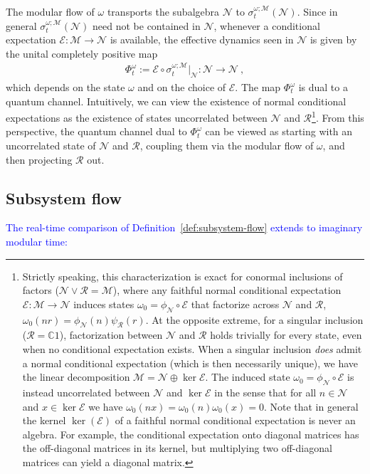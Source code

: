 \documentclass[a4paper,11pt]{article}
\theoremstyle{definition}
\newcommand{\mR}{\mathcal{R}}
\newcommand{\mN}{\mathcal{N}}
\newcommand{\mM}{\mathcal{M}}
\newcommand{\NL}[1]{\textcolor{blue}{#1}}
\newcommand{\mE}{\mathcal{E}}
\begin{document}
The modular flow of $\omega$ transports the subalgebra $\mN$ to
$\sigma^{\omega;\mM}_t(\mN)$. Since in general
$\sigma^{\omega;\mM}_t(\mN)$ need not be contained in $\mN$, whenever a conditional expectation $\mE:\mM\to\mN$ is available, the effective dynamics seen in $\mN$ is given by the unital completely positive map
\begin{align}
    \Phi^{\omega}_t:=\mE\circ\sigma^{\omega;\mM}_t\big|_{\mN}:\mN\to\mN\ ,
    \label{eq:reduced-dynamics}
\end{align}
which depends on the state $\omega$ and on the choice of $\mE$. The map $\Phi^{\omega}_t$ is dual to a quantum channel. Intuitively, we can view the existence of normal conditional expectations as the existence of states uncorrelated between $\mN$ and $\mR$\footnote{Strictly speaking, this characterization is exact for conormal inclusions of factors ($\mN \vee \mR = \mM$), where any faithful normal conditional expectation $\mE: \mM \to \mN$ induces states $\omega_0 = \phi_{\mN} \circ \mE$ that factorize across $\mN$ and $\mR$, $\omega_0(nr) = \phi_{\mN}(n)\psi_{\mR}(r)$. At the opposite extreme, for a singular inclusion ($\mR = \mathbb{C}1$), factorization between $\mN$ and $\mR$ holds trivially for every state, even when no conditional expectation exists. When a singular inclusion \emph{does} admit a normal conditional expectation (which is then necessarily unique), we have the linear decomposition $\mM=\mN\oplus \ker{\mE}$.  The induced state $\omega_0 = \phi_{\mN} \circ \mE$ is instead uncorrelated between $\mN$ and $\ker\mE$ in the sense that for all $n\in\mN$ and $x\in \ker\mE$ we have $\omega_0(n x)=\omega_0(n) \omega_0(x)=0$. Note that in general the kernel $\ker(\mE)$ of a faithful normal conditional expectation is never an algebra. For example, the conditional expectation onto diagonal matrices has the off-diagonal matrices in its kernel, but multiplying two off-diagonal matrices can yield a diagonal matrix.}. From this perspective, the quantum channel dual to $\Phi^{\omega}_t$ can be viewed as starting with an uncorrelated state of $\mN$ and $\mR$, coupling them via the modular flow of $\omega$, and then projecting $\mR$ out.

\subsection{Subsystem flow}
\label{subsec:analytic-subsystem-flow}

\NL{The real-time comparison of Definition~\ref{def:subsystem-flow} extends to imaginary modular time:}
\end{document}
